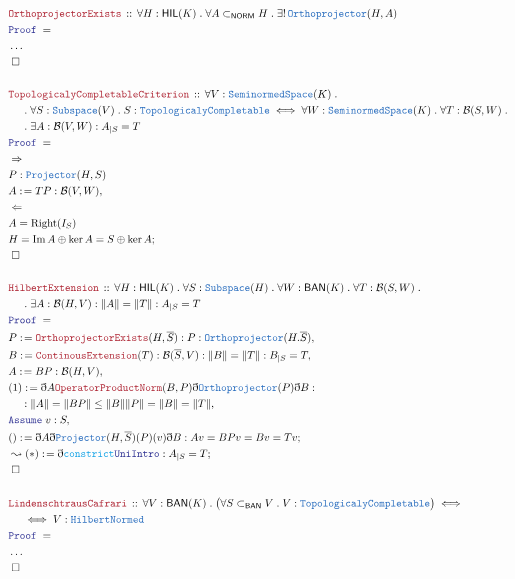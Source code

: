 \documentclass[12pt]{scrartcl}
\newcommand{\TYPE}[1]{\textcolor{NavyBlue}{\mathtt{#1}}}
\newcommand{\FUNC}[1]{\textcolor{Cerulean}{\mathtt{#1}}}
\newcommand{\LOGIC}[1]{\textcolor{Blue}{\mathtt{#1}}}
\newcommand{\THM}[1]{\textcolor{Maroon}{\mathtt{#1}}}
\renewcommand{\.}{\; . \;}
\newcommand{\de}{: \kern 0.1pc =}
\newcommand{\Theorem}[2]{& \THM{#1} \, :: \, #2 \\ & \Proof = \\ }
\newcommand{\NewLine}{\\ & \kern 1pc}
\newcommand{\Page}[1]{\begin{align*} #1 \end{align*} \newpage   }
\newcommand{ \bd }{ \ByDef }
\newcommand{\NoProof}{ & \ldots \\ \EndProof}
\DeclareMathOperator*{\im}{Im}
\newcommand{\Say}[3]{& #1 \de #2 : #3, \\}
\newcommand{\Conclude}[3]{& #1 \de #2 : #3; \\}
\newcommand{\DeriveConclude}[3]{& \leadsto #1 \de #2 : #3 ; \\}
\newcommand{\A}{\LOGIC{Assume} \;}
\newcommand{\Assume}[2]{& \A #1 : #2, \\}
\newcommand{\QED}{\; \square}
\newcommand{\EndProof}{& \QED \\}
\newcommand{\ByDef}{\eth}
\newcommand{\Proof}{\LOGIC{Proof} \; }
\newcommand{\SNS}{\TYPE{SeminormedSpace}}
\newcommand{\NORM}{\textsf{NORM}}
\newcommand{\BAN}{\textsf{BAN}}
\newcommand{\HIL}{\textsf{HIL}}
\newcommand{\B}{\mathcal{B}}
\begin{document}
\Page{
\Theorem{OrthoprojectorExists}{\forall H : \HIL(K) \. \forall A \subset_{\NORM} H 
\.
\exists! \,  \TYPE{Orthoprojector}(H,A)
}
\NoProof
\\
\Theorem{TopologicalyCompletableCriterion}{\forall V : \SNS(K) \. \NewLine \. \forall S : \TYPE{Subspace}(V) \.
S : \TYPE{TopologicalyCompletable} \iff \forall W : \SNS(K) \. \forall T : \B(S,W) \.
\NewLine \.
\exists A : \B(V,W) :  A_{|S} = T
}
&  \Rightarrow    \\
&   P : \TYPE{Projector}(H,S)     \\
  \Say{A}{TP}{\B(V,W)}
& \Leftarrow \\
& A = \mathrm{Right}(I_S)           \\ 
& H = \im A \oplus \ker A =  S \oplus \ker A ; \\
\EndProof
\\
\Theorem{HilbertExtension}{\forall H : \HIL(K) \. \forall S : \TYPE{Subspace}(H) \. \forall W : \BAN(K) \. \forall T : \B(S,W) \. 
 \NewLine \.
 \exists A : \B(H,V) : \| A \| = \| T \| : A_{|S} = T
} 
\Say{P}{\THM{OrthoprojectorExists}(H,\overline{S})}{P : \TYPE{Orthoprojector}(H.\overline{S})}
\Say{B}{\THM{ContinousExtension}(T)}{\B(\overline{S},V) : \| B \| = \| T \| : B_{|S} = T }
\Say{A}{BP}{\B(H,V)}
\Say{(1)}{ \bd A \THM{OperatorProductNorm}(B,P)\bd \TYPE{Orthoprojector}(P) \bd B }
{
\NewLine :
\| A \| = \| B P \| \le \| B \| \| P \| = \| B \| = \| T \|}                                      
\Assume{v}{S}
\Conclude{()}{\bd A \bd \TYPE{Projector}(H,\overline{S})(P)(v)\bd B}{Av = BPv = Bv = Tv }
\DeriveConclude{(*)}{ \bd \FUNC{constrict} \LOGIC{UniIntro}}{ A_{|S} = T}
\EndProof
\\
\Theorem{LindenschtrausCafrari}{\forall V : \BAN(K) \. \big( \forall S \subset_{\BAN} V \. V : \TYPE{TopologicalyCompletable} \big) \iff \NewLine
\iff  V : \TYPE{HilbertNormed} }
\NoProof
}
\end{document}
